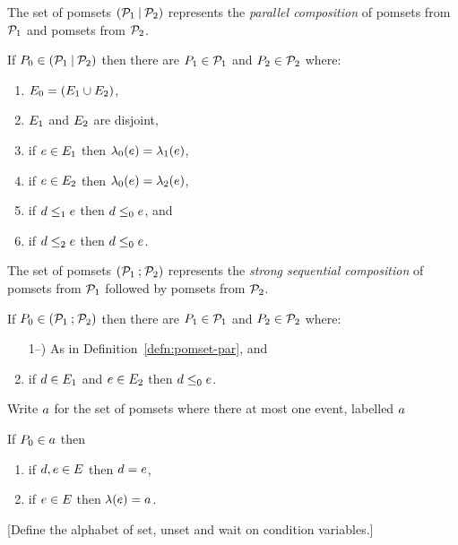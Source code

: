 The set of pomsets $(\mathcal{P}_1\mathbin{\mid}\mathcal{P}_2)$ represents the \emph{parallel composition} of pomsets from
$\mathcal{P}_1$ and pomsets from $\mathcal{P}_2$.
\begin{definition}
  \label{defn:pomset-par}
  If $P_0 \in (\mathcal{P}_1\mathbin{\mid}\mathcal{P}_2)$ then
  there are $P_1\in\mathcal{P}_1$ and $P_2\in\mathcal{P}_2$ where:
  \begin{enumerate}
  \item $E_0 = (E_1\cup E_2)$,
  \item $E_1$ and  $E_2$ are disjoint,
  \item if $e\in E_1$ then $\lambda_0(e) = \lambda_1(e)$, 
  \item if $e\in E_2$ then $\lambda_0(e) = \lambda_2(e)$,
  \item if $d\le_1e$ then $d\le_0e$, and
  \item if $d\le_2e$ then $d\le_0e$.
    \setcounter{pomsetParCount}{\value{enumi}}
  \end{enumerate}
\end{definition}
 
The set of pomsets $(\mathcal{P}_1\mathbin{;}\mathcal{P}_2)$ represents the \emph{strong sequential composition} of pomsets from
$\mathcal{P}_1$ followed by pomsets from $\mathcal{P}_2$.
\begin{definition}
  If $P_0 \in (\mathcal{P}_1\mathbin{;}\mathcal{P}_2)$ then
  there are $P_1\in\mathcal{P}_1$ and $P_2\in\mathcal{P}_2$ where:
  \begin{enumerate}
    \setcounter{enumi}{\value{pomsetParCount}}
  \item[1--\thepomsetParCount)] As in Definition~\ref{defn:pomset-par}, and
  \item if $d\in E_1$ and $e\in E_2$ then $d\le_0e$.
  \end{enumerate}
\end{definition}

Write $a$ for the set of pomsets where there at most one event, labelled $a$
\begin{definition}
  If $P_0 \in a$ then
  \begin{enumerate}
  \item if $d,e\in E$ then $d=e$,
  \item if $e\in E$ then $\lambda(e)=a$.
  \end{enumerate}
\end{definition}

[Define the alphabet of set, unset and wait on condition variables.]

